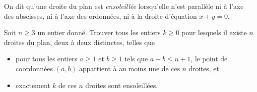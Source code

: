 On dit qu'une droite du plan est \emph{ensoleillée} lorsqu'elle n'est
parallèle ni à l'axe des abscisses, ni à l'axe des ordonnées, ni à la
droite d'équation $x + y = 0$.

Soit $n \geqslant 3$ un entier donné. Trouver tous les entiers
$k \geqslant 0$ pour lesquels il existe $n$ droites du plan, deux à
deux distinctes, telles que
\begin{itemize}
  \item pour tous les entiers $a \geqslant 1$ et $b \geqslant 1$ tels
  que $a + b \leqslant n + 1$, le point de coordonnées $(a, b)$
  appartient à au moins une de ces $n$ droites, et
  \item exactement $k$ de ces $n$ droites sont ensoleillées.
\end{itemize}
